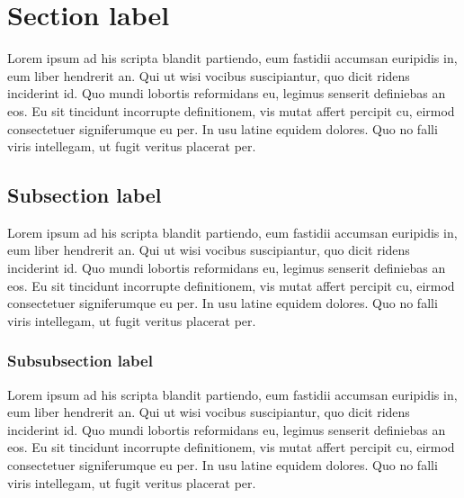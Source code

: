 \documentclass[10pt, english, pdftex]{template/UC3M_document}
\author{Aitor Alonso Núñez}         %
\begin{document}
\titleMain

{\hypersetup{linkcolor=black}   %
\tableofcontents\newpage        %
}

\section{Section label}
Lorem ipsum ad his scripta blandit partiendo, eum fastidii accumsan euripidis in, eum liber hendrerit an. Qui ut wisi vocibus suscipiantur,
quo dicit ridens inciderint id. Quo mundi lobortis reformidans eu, legimus senserit definiebas an eos. Eu sit tincidunt incorrupte definitionem,
vis mutat affert percipit cu, eirmod consectetuer signiferumque eu per. In usu latine equidem dolores. Quo no falli viris intellegam, ut fugit
veritus placerat per.

\subsection{Subsection label}
Lorem ipsum ad his scripta blandit partiendo, eum fastidii accumsan euripidis in, eum liber hendrerit an. Qui ut wisi vocibus suscipiantur,
quo dicit ridens inciderint id. Quo mundi lobortis reformidans eu, legimus senserit definiebas an eos. Eu sit tincidunt incorrupte definitionem,
vis mutat affert percipit cu, eirmod consectetuer signiferumque eu per. In usu latine equidem dolores. Quo no falli viris intellegam, ut fugit
veritus placerat per.

\subsubsection{Subsubsection label}\label{subsubsection_label}
Lorem ipsum ad his scripta blandit partiendo, eum fastidii accumsan euripidis in, eum liber hendrerit an. Qui ut wisi vocibus suscipiantur,
quo dicit ridens inciderint id. Quo mundi lobortis reformidans eu, legimus senserit definiebas an eos. Eu sit tincidunt incorrupte definitionem,
vis mutat affert percipit cu, eirmod consectetuer signiferumque eu per. In usu latine equidem dolores. Quo no falli viris intellegam, ut fugit
veritus placerat per.
\end{document}
